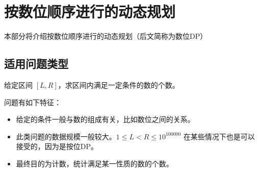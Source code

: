 \begin{Shaded}
\begin{Highlighting}[]
\OperatorTok{[}\OperatorTok{][}\OperatorTok{]=((}\OperatorTok{[}\OperatorTok{][}\OperatorTok{]+}\OperatorTok{[}\OperatorTok{][}\OperatorTok{])\%}\OperatorTok{{-}}\OperatorTok{[}\OperatorTok{][}\OperatorTok{]+}\OperatorTok{)\%}\OperatorTok{;}
    \OperatorTok{\}}
    \OperatorTok{=}\OperatorTok{;}
    \OperatorTok{(}\OperatorTok{=}\OperatorTok{;}\OperatorTok{\textless{}(}\OperatorTok{\textless{}\textless{}}\OperatorTok{);}\OperatorTok{++)}
    \OperatorTok{(}\OperatorTok{=}\OperatorTok{;}\OperatorTok{\textless{}(}\OperatorTok{\textless{}\textless{}}\OperatorTok{);}\OperatorTok{++)}
        \OperatorTok{((}\OperatorTok{\&}\OperatorTok{)==}\OperatorTok{)}\OperatorTok{(}\OperatorTok{,}\OperatorTok{[}\OperatorTok{][}\OperatorTok{]);}
\OperatorTok{\textless{}\textless{}}\OperatorTok{\textless{}\textless{}}\CharTok{\textquotesingle{}}\CharTok{\textquotesingle{}}\OperatorTok{;}
     \OperatorTok{;}
\OperatorTok{\}}
\end{Highlighting}
\end{Shaded}

\section{按数位顺序进行的动态规划}

本部分将介绍按数位顺序进行的动态规划（后文简称为数位DP）

\subsection{适用问题类型}

给定区间 \([L,R]\)，求区间内满足一定条件的数的个数。

问题有如下特征：

\begin{itemize}
\item
  给定的条件一般与数的组成有关，比如数位之间的关系。
\item
  此类问题的数据规模一般较大。\(1\leq L<R\leq 10^{100000}\)
  在某些情况下也是可以接受的，因为是按位DP。
\item
  最终目的为计数，统计满足某一性质的数的个数。
\end{itemize}

